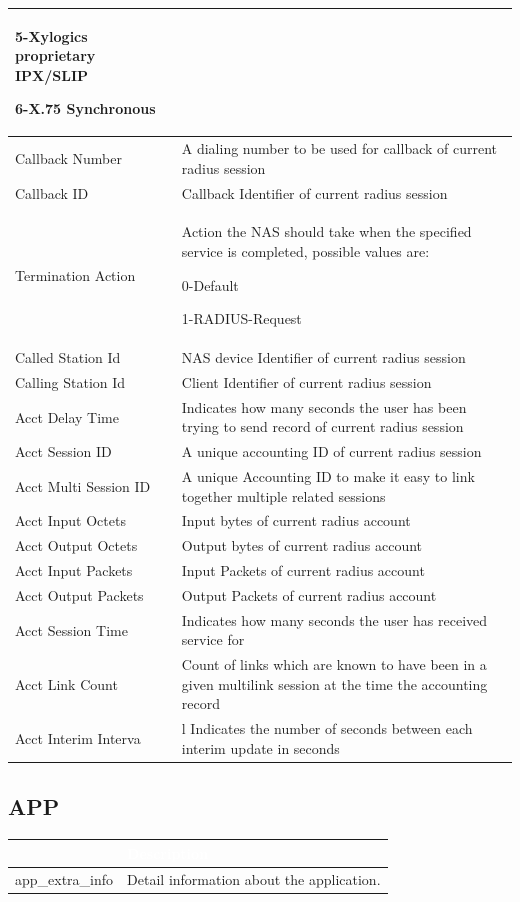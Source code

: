 \begin{longtable}{p{}|p{}}
                        5-Xylogics proprietary IPX/SLIP


                        6-X.75 Synchronous \\\hline                                                                                
    Callback Number &	A dialing number to be used for callback of current radius session \\\hline
    Callback ID &	Callback Identifier of current radius session \\\hline
    Termination Action &	Action the NAS should take when the specified service is completed, possible values are:


                            0-Default


                            1-RADIUS-Request \\\hline
    Called Station Id &	NAS device Identifier of current radius session \\\hline
    Calling Station Id &	Client Identifier of current radius session \\\hline
    Acct Delay Time &	Indicates how many seconds the user has been trying to send record of current radius session \\\hline
    Acct Session ID &	A unique accounting ID of current radius session \\\hline
    Acct Multi Session ID &	A unique Accounting ID to make it easy to link together multiple related sessions \\\hline
    Acct Input Octets &	Input bytes of current radius account \\\hline
    Acct Output Octets &	Output bytes of current radius account \\\hline
    Acct Input Packets &	Input Packets of current radius account \\\hline
    Acct Output Packets &	Output Packets of current radius account \\\hline
    Acct Session Time &	Indicates how many seconds the user has received service for \\\hline
    Acct Link Count &	Count of links which are known to have been in a given multilink session at the time the accounting record \\\hline
    Acct Interim Interva &l	Indicates the number of seconds between each interim update in seconds \\\hline                            
\end{longtable} 

\subsection*{\hypertarget{link:APP}{APP}}
\label{sec:appendix_c:protocol:APP}

\begin{longtable}{p{}|p{}}   
    \rowcolor{black}\multicolumn{1}{l!\vlinewhite}{\textcolor{white}{Field}}  & \textcolor{white}{Description} \\\hline
    app\_extra\_info  &	Detail information about the application. \\\hline
\end{longtable} 